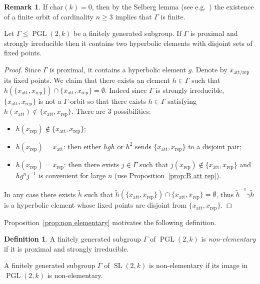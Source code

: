 \documentclass[10pt]{amsart}
\theoremstyle{definition}\newtheorem{defi}[theo]{Definition}\newtheorem{rema}[theo]{Remark}\newtheorem{exam}[theo]{Example}\newtheorem{exem}[theo]{Example}\newtheorem{nota}[theo]{Notation}
\DeclareMathOperator{\SL}{SL}
\DeclareMathOperator{\PGL}{PGL}
\newcommand{\att}{\mathrm{att}}
\newcommand{\rep}{\mathrm{rep}}
\newcommand{\PGLk}{\PGL(2, k)}
\newcommand{\inv}{^{-1}}
\begin{document}
\begin{rema}
If $\mathrm{char}(k) = 0$, then by the Selberg lemma (see e.g.~\cite{alperin}) the existence of a finite orbit of cardinality $n\geq 3$ implies that $\Gamma$ is finite.
\end{rema}



\begin{prop}\label{prop:non elementary}
Let $\Gamma\leq \PGLk$ be a finitely generated subgroup. If $\Gamma$ is proximal and strongly irreducible then it contains two hyperbolic elements with disjoint sets of fixed points.
\end{prop}

\begin{proof}
Since $\Gamma$ is proximal, it contains a hyperbolic element $g$. Denote by $x_{\att/\rep}$ its fixed points. We claim that there exists an element $h \in \Gamma$ such that $h(\{ x_\att, x_\rep\}) \cap\{ x_\att, x_\rep\}= \emptyset$. Indeed since $\Gamma$ is strongly irreducible, $\{ x_\att, x_\rep\}$ is not a $\Gamma$-orbit so that there exists $h\in \Gamma$ satisfying $h(x_\att) \notin \{ x_\att, x_\rep\}$. There are 3 possibilities:
\begin{itemize}
\item $h(x_\rep)\notin \{ x_\att, x_\rep\}$;
\item $h(x_\rep) = x_\att$: then either $hgh$ or $h^2$ sends $\{ x_\att, x_\rep\}$ to a disjoint pair;
\item $h(x_\rep) = x_\rep$: then there exists $j\in \Gamma$ such that $j(x_\rep)\notin \{ x_\att, x_\rep\}$ and $hg^nj\inv$ is convenient for large $n$ (use Proposition~\ref{prop:B att rep}).
\end{itemize}
In any case there exists $\tilde{h}$ such that $\tilde{h}(\{ x_\att, x_\rep\})\cap \{ x_\att, x_\rep\}=\emptyset$, thus $\tilde{h}^{- 1} \gamma \tilde{h}$ is a hyperbolic element whose fixed points are disjoint from $\{ x_\att, x_\rep\}$.
\end{proof}

Proposition~\ref{prop:non elementary} motivates the following definition.

\begin{defi}
A finitely generated subgroup $\Gamma$ of $\PGL(2,k)$ is \emph{non-elemen\-tary} if it is proximal and strongly irreducible.

A finitely generated subgroup $\Gamma$ of $\SL(2,k)$ is non-elementary if its image in $\PGL(2,k)$ is non-elementary.
\end{defi}
\end{document}
